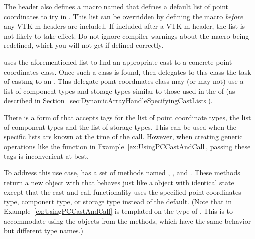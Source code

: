The  header also defines a
macro named  that
defines a default list of point coordinates to try in
. This list can be overridden by
defining the  macro
\emph{before} any VTK-m headers are included. If included after a VTK-m
header, the list is not likely to take effect. Do not ignore compiler
warnings about the macro being redefined, which you will not get if defined
correctly.


 uses the aforementioned list to
find an appropriate cast to a concrete point coordinates class. Once such a
class is found,  then delegates to this class the
task of casting to an . This delegate point
coordinates class may (or may not) use a list of component types and
storage types similar to those used in the  of
 (as described in
Section~\ref{sec:DynamicArrayHandleSpecifyingCastLists}).

There is a form of  that accepts tags for the list of
point coordinate types, the list of component types and the list of
storage types. This can be used when the specific lists are known at the
time of the call. However, when creating generic operations like the
 function in
Example~\ref{ex:UsingPCCastAndCall}, passing these tags is inconvenient at
best.

To address this use case,  has a
set of methods named ,
, and . These methods
return a new object with that behaves just like a
 object with identical state except
that the cast and call functionality uses the specified point coordinates
type, component type, or storage type instead of the default. (Note that
 in Example~\ref{ex:UsingPCCastAndCall} is
templated on the type of . This is
to accommodate using the objects from the  methods,
which have the same behavior but different type names.)

